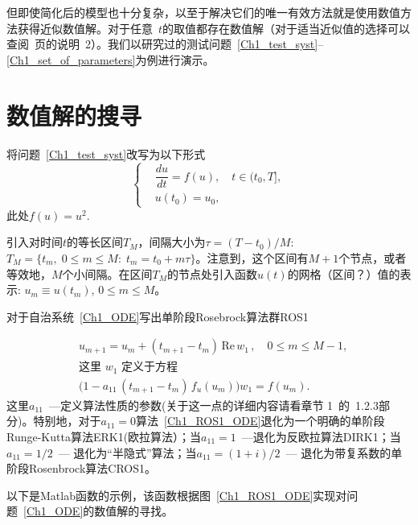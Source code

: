 \documentclass[twoside]{book}
\begin{document}
\begin{CJK*}{GBK}{song}
但即使简化后的模型也十分复杂，以至于解决它们的唯一有效方法就是使用数值方法获得近似数值解。对于任意~$t$的取值都存在数值解（对于适当近似值的选择可以查阅~\pageref{rem02}页的说明~2）。我们以研究过的测试问题~\eqref{Ch1_test_syst}--\eqref{Ch1_set_of_parameters}为例进行演示。


\section{数值解的搜寻}


将问题~\eqref{Ch1_test_syst}改写为以下形式
\begin{equation}
    \label{Ch1_ODE}
    \left\{
    \begin{aligned}
        &\dfrac{d u}{d t} = f(u), \quad t \in (t_0,T],\\
        &u(t_0) = u_0,
    \end{aligned}
    \right.
\end{equation}
此处$f(u) = u^2$.

引入对时间$t$的等长区间$T_M$，间隔大小为$\tau = (T - t_0)/M$: $T_M = \{t_m, \; 0 \leqslant m \leqslant M: \; t_m = t_0 + m \tau\}$。注意到，这个区间有$M + 1$个节点，或者等效地，$M$个小间隔。在区间$T_M$的节点处引入函数$u(t)$的网格（区间？）值的表示: $u_m \equiv u(t_m)$, $0 \leqslant m \leqslant M$。

对于自治系统~\eqref{Ch1_ODE}写出单阶段Rosebrock算法群ROS1~\cite{Kalitkin_book_2,Hairer&Wanner}

\begin{equation}
    \label{Ch1_ROS1_ODE}
    \begin{aligned}
        &u_{m + 1} = u_m + (t_{m + 1} - t_m) \, \mathrm{Re} \, w_1 \, , \quad 0 \leqslant m \leqslant M - 1,\\
        &\mbox{这里 $w_1$ 定义于方程} \\
        &\!\Big(1 - a_{11} \, (t_{m + 1} - t_m) \, f_u(u_m)\Big) w_1 =
        f (u_m).
    \end{aligned}
\end{equation}
这里$a_{11}$~---定义算法性质的参数(关于这一点的详细内容请看章节 1~\cite{Kalitkin_book_2}的~1.2.3部分)。特别地，对于$a_{11} = 0$算法~\eqref{Ch1_ROS1_ODE}退化为一个明确的单阶段Runge-Kutta算法ERK1(欧拉算法）；当$a_{11} = 1$~---退化为反欧拉算法DIRK1；当$a_{11} = 1/2$~--- 退化为“半隐式”算法；当$a_{11} = (1 + i)/2$~--- 退化为带复系数的单阶段Rosenbrock算法CROS1。

以下是Matlab函数的示例，该函数根据图~\eqref{Ch1_ROS1_ODE}实现对问题~\eqref{Ch1_ODE}的数值解的寻找。


\end{CJK*}
\end{document}

